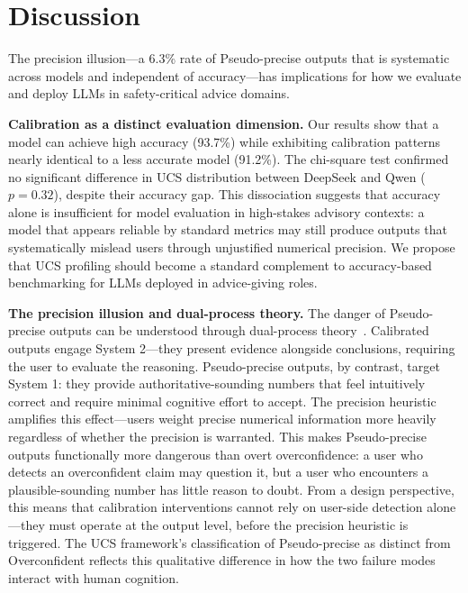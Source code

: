 \documentclass[manuscript, review, anonymous]{acmart}
\begin{document}

\section{Discussion}
\label{sec:discussion}

The precision illusion---a 6.3\% rate of Pseudo-precise outputs that is systematic across models and independent of accuracy---has implications for how we evaluate and deploy LLMs in safety-critical advice domains.

\textbf{Calibration as a distinct evaluation dimension.} Our results show that a model can achieve high accuracy (93.7\%) while exhibiting calibration patterns nearly identical to a less accurate model (91.2\%). The chi-square test confirmed no significant difference in UCS distribution between DeepSeek and Qwen ($p = 0.32$), despite their accuracy gap. This dissociation suggests that accuracy alone is insufficient for model evaluation in high-stakes advisory contexts: a model that appears reliable by standard metrics may still produce outputs that systematically mislead users through unjustified numerical precision. We propose that UCS profiling should become a standard complement to accuracy-based benchmarking for LLMs deployed in advice-giving roles.

\textbf{The precision illusion and dual-process theory.} The danger of Pseudo-precise outputs can be understood through dual-process theory~\cite{kahneman2011thinking}. Calibrated outputs engage System 2---they present evidence alongside conclusions, requiring the user to evaluate the reasoning. Pseudo-precise outputs, by contrast, target System 1: they provide authoritative-sounding numbers that feel intuitively correct and require minimal cognitive effort to accept. The precision heuristic~\cite{zhang2012precision, jerez2014precision} amplifies this effect---users weight precise numerical information more heavily regardless of whether the precision is warranted. This makes Pseudo-precise outputs functionally more dangerous than overt overconfidence: a user who detects an overconfident claim may question it, but a user who encounters a plausible-sounding number has little reason to doubt. From a design perspective, this means that calibration interventions cannot rely on user-side detection alone---they must operate at the output level, before the precision heuristic is triggered. The UCS framework's classification of Pseudo-precise as distinct from Overconfident reflects this qualitative difference in how the two failure modes interact with human cognition.
\end{document}

